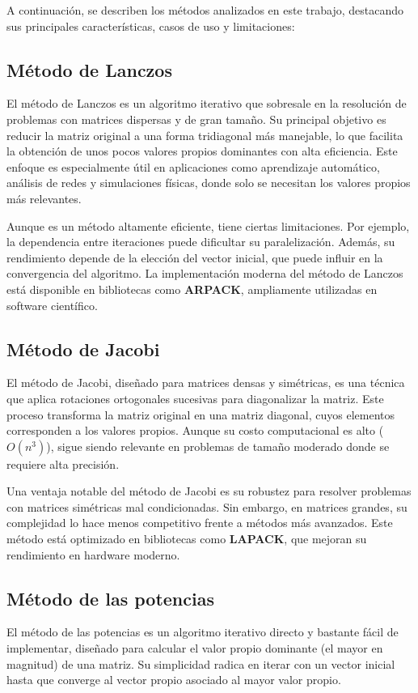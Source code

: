 \documentclass{article}
\begin{document}
A continuación, se describen los métodos analizados en este trabajo, destacando sus principales características, casos de uso y limitaciones:

\subsection{Método de Lanczos}
El método de Lanczos es un algoritmo iterativo que sobresale en la resolución de problemas con matrices dispersas y de gran tamaño. Su principal objetivo es reducir la matriz original a una forma tridiagonal más manejable, lo que facilita la obtención de unos pocos valores propios dominantes con alta eficiencia. Este enfoque es especialmente útil en aplicaciones como aprendizaje automático, análisis de redes y simulaciones físicas, donde solo se necesitan los valores propios más relevantes.

Aunque es un método altamente eficiente, tiene ciertas limitaciones. Por ejemplo, la dependencia entre iteraciones puede dificultar su paralelización. Además, su rendimiento depende de la elección del vector inicial, que puede influir en la convergencia del algoritmo. La implementación moderna del método de Lanczos está disponible en bibliotecas como \textbf{ARPACK}, ampliamente utilizadas en software científico.

\subsection{Método de Jacobi}
El método de Jacobi, diseñado para matrices densas y simétricas, es una técnica que aplica rotaciones ortogonales sucesivas para diagonalizar la matriz. Este proceso transforma la matriz original en una matriz diagonal, cuyos elementos corresponden a los valores propios. Aunque su costo computacional es alto (\(O(n^3)\)), sigue siendo relevante en problemas de tamaño moderado donde se requiere alta precisión.

Una ventaja notable del método de Jacobi es su robustez para resolver problemas con matrices simétricas mal condicionadas. Sin embargo, en matrices grandes, su complejidad lo hace menos competitivo frente a métodos más avanzados. Este método está optimizado en bibliotecas como \textbf{LAPACK}, que mejoran su rendimiento en hardware moderno.

\subsection{Método de las potencias}
El método de las potencias es un algoritmo iterativo directo y bastante fácil de implementar, diseñado para calcular el valor propio dominante (el mayor en magnitud) de una matriz. Su simplicidad radica en iterar con un vector inicial hasta que converge al vector propio asociado al mayor valor propio.
\end{document}
